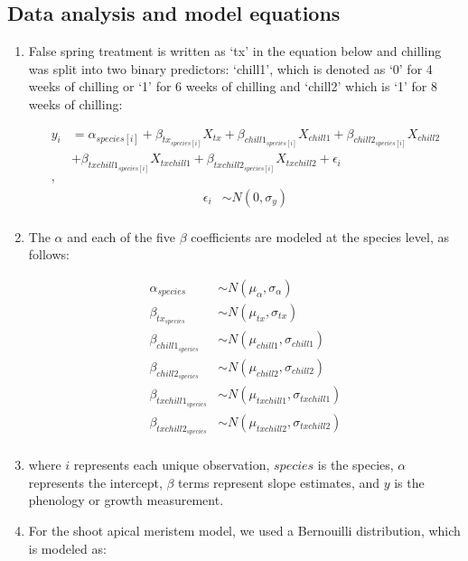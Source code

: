 \documentclass{article}\usepackage[]{graphicx}\usepackage[]{color}
\begin{document}
\subsection*{Data analysis and model equations}
\begin{enumerate}
\item False spring treatment is written as `tx' in the equation below and chilling was split into two binary predictors: `chill1', which is denoted as `0' for 4 weeks of chilling or `1' for 6 weeks of chilling and `chill2' which is `1' for 8 weeks of chilling:

\begin{align*}
y_i &= \alpha_{species[i]} + \beta_{tx_{species[i]}}X_{tx} + \beta_{chill1_{species[i]}}X_{chill1} + \beta_{chill2_{species[i]}}X_{chill2}\\
&+ \beta_{txchill1_{species[i]}}X_{txchill1} + \beta_{txchill2_{species[i]}}X_{txchill2} + \epsilon_i \tag{1}\\,
\end{align*}
\begin{align*}
\epsilon_i & \sim N(0,\sigma_y) \\
\end{align*}

\item The $\alpha$ and each of the five $\beta$ coefficients are modeled at the species level, as follows:

\begin{align*}
\alpha_{species} & \sim N(\mu_{\alpha}, \sigma_{\alpha}) \\
\beta_{tx_{species}} & \sim N(\mu_{tx}, \sigma_{tx}) \\
\beta_{chill1_{species}} & \sim N(\mu_{chill1}, \sigma_{chill1}) \\
\beta_{chill2_{species}} & \sim N(\mu_{chill2}, \sigma_{chill2}) \\
\beta_{txchill1_{species}} & \sim N(\mu_{txchill1}, \sigma_{txchill1}) \\
\beta_{txchill2_{species}} & \sim N(\mu_{txchill2}, \sigma_{txchill2}) \\
\end{align*}

\item where $i$ represents each unique observation, $species$ is the species, $\alpha$ represents the intercept, $\beta$ terms represent slope estimates, and $y$ is the phenology or growth measurement. 
\item For the shoot apical meristem model, we used a Bernouilli distribution, which is modeled as:


\end{enumerate}
\end{document}
